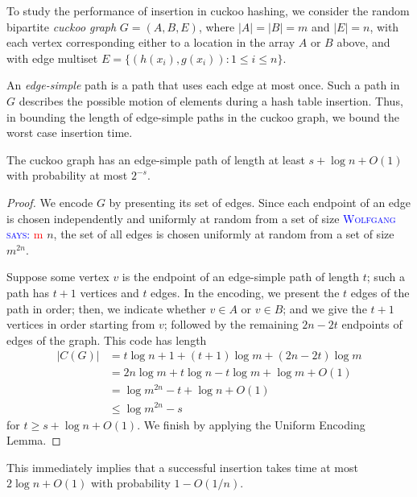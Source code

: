 \documentclass{patmorin}
\newcommand{\aremark}[3]{\textcolor{blue}{\textsc{#1 #2:}}
  \textcolor{red}{\textsf{#3}}}
\newcommand{\wolfgang}[2][says]{\aremark{Wolfgang}{#1}{#2}}
\begin{document}
To study the performance of insertion in cuckoo hashing, we consider the
random bipartite \emph{cuckoo graph} $G = (A, B, E)$, where $|A| = |B|
= m$ and $|E| = n$, with each vertex corresponding either to a
location in the array $A$ or $B$ above, and with edge multiset $E =
\{(h(x_i), g(x_i)) : 1 \leq i \leq n\}$.

An \emph{edge-simple} path is a path that uses each edge at most once. Such
a path in $G$ describes the possible motion of elements during a
hash table insertion. Thus, in bounding the length of edge-simple
paths in the cuckoo graph, we bound the worst case insertion time.

\begin{lem}
  The cuckoo graph has an edge-simple path of length at least
  $s + \log n + O(1)$ with probability at most $2^{-s}$.
\end{lem}
\begin{proof}
  We encode $G$ by presenting its set of edges. Since each endpoint of
  an edge is chosen independently and uniformly at random from a set
  of size \wolfgang{m} $n$, the set of all edges is chosen uniformly at random
  from a set of size $m^{2n}$.

  Suppose some vertex $v$ is the endpoint of an edge-simple path
  of length $t$; such a path has $t + 1$ vertices and $t$ edges. In
  the encoding, we present the $t$ edges of the path in order; then,
  we indicate whether $v \in A$ or $v \in B$; and we give the $t + 1$
  vertices in order starting from $v$; followed by the remaining
  $2n - 2t$ endpoints of edges of the graph. This code has length
  \begin{align*}
    |C(G)| &= t \log n + 1 + (t + 1) \log m + (2n - 2t) \log m\\
           &= 2n \log m + t \log n - t \log m + \log m + O(1) \\
           &= \log m^{2n} - t + \log n + O(1) \tag{since $m = 2n$} \\
           &\leq \log m^{2n} - s
  \end{align*}
  for $t \geq s + \log n + O(1)$. We finish by applying the Uniform
  Encoding Lemma.
\end{proof}
This immediately implies that a successful insertion takes time at
most $2 \log n + O(1)$ with probability $1 - O(1/n)$.
\end{document}
